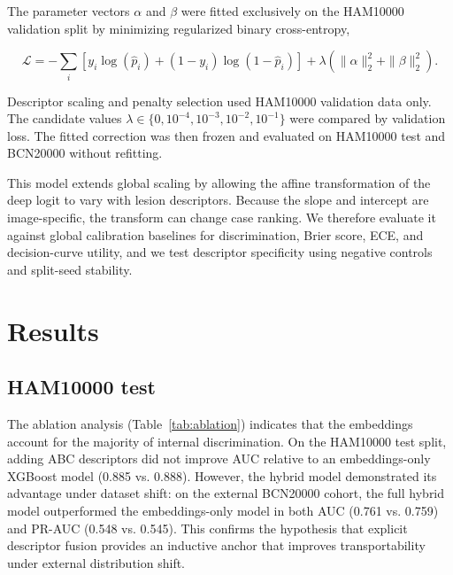 \documentclass[preprint,12pt]{elsarticle}
\begin{document}
The parameter vectors $\alpha$ and $\beta$ were fitted exclusively on the HAM10000 validation split by minimizing regularized binary cross-entropy,

\begin{equation}
\mathcal{L} =
-\sum_i \left[y_i \log(\hat{p}_i) + (1-y_i)\log(1-\hat{p}_i)\right]
+ \lambda \left(\|\alpha\|_2^2 + \|\beta\|_2^2\right).
\end{equation}

Descriptor scaling and penalty selection used HAM10000 validation data only. The candidate values $\lambda \in \{0,10^{-4},10^{-3},10^{-2},10^{-1}\}$ were compared by validation loss. The fitted correction was then frozen and evaluated on HAM10000 test and BCN20000 without refitting.

This model extends global scaling by allowing the affine transformation of the deep logit to vary with lesion descriptors. Because the slope and intercept are image-specific, the transform can change case ranking. We therefore evaluate it against global calibration baselines for discrimination, Brier score, ECE, and decision-curve utility, and we test descriptor specificity using negative controls and split-seed stability.


\section{Results}

\subsection{HAM10000 test}

The ablation analysis (Table~\ref{tab:ablation}) indicates that the embeddings account for the majority of internal discrimination. On the HAM10000 test split, adding ABC descriptors did not improve AUC relative to an embeddings-only XGBoost model (0.885 vs. 0.888). However, the hybrid model demonstrated its advantage under dataset shift: on the external BCN20000 cohort, the full hybrid model outperformed the embeddings-only model in both AUC (0.761 vs. 0.759) and PR-AUC (0.548 vs. 0.545). This confirms the hypothesis that explicit descriptor fusion provides an inductive anchor that improves transportability under external distribution shift.

\begin{table}[htbp]
\centering
\caption{Primary HAM10000 test performance under lesion-level separation (threshold = 0.5).}
\label{tab:internal_performance}
\end{table}
\end{document}
